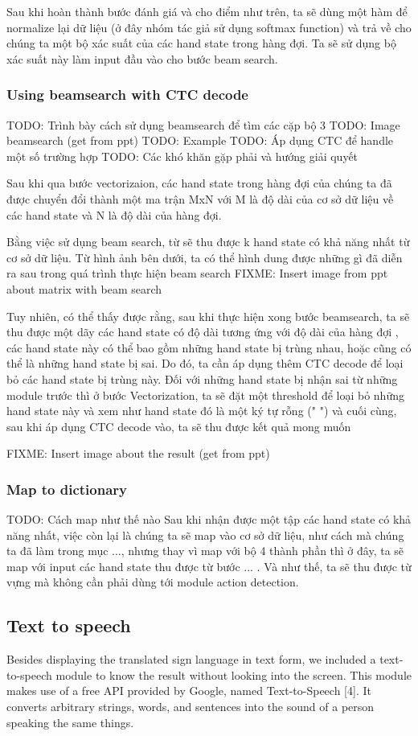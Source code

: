 Sau khi hoàn thành bước đánh giá và cho điểm như trên, ta sẽ dùng một hàm để normalize
lại dữ liệu (ở đây nhóm tác giả sử dụng softmax function) và trả về cho chúng ta một bộ xác suất của các hand state trong hàng đợi. Ta sẽ sử dụng bộ xác suất này
làm input đầu vào cho bước beam search.
\subsubsection{ Using beamsearch with CTC decode }
TODO: Trình bày cách sử dụng beamsearch để tìm các cặp bộ 3
TODO: Image beamsearch (get from ppt)
TODO: Example
TODO: Áp dụng CTC để handle một số trường hợp
TODO: Các khó khăn gặp phải và hướng giải quyết
      
Sau khi qua bước vectorizaion, các hand state trong hàng đợi của chúng ta
đã được chuyển đổi thành một ma trận MxN với M là độ dài của cơ sở dữ liệu về
các hand state và N là độ dài của hàng đợi.
      
Bằng việc sử dụng beam search, từ sẽ thu được k hand state có khả năng nhất
từ cơ sở dữ liệu. Từ hình ảnh bên dưới, ta có thể hình dung được những gì
đã diễn ra sau trong quá trình thực hiện beam search
FIXME: Insert image from ppt about matrix with beam search

Tuy nhiên, có thể thấy được rằng, sau khi thực hiện xong bước beamsearch,
ta sẽ thu được một dãy các hand state có độ dài tương ứng với độ dài của hàng đợi
, các hand state này có thể bao gồm những hand state bị trùng nhau, hoặc cũng có thể
là những hand state bị sai. Do đó, ta cần áp dụng thêm CTC decode để loại bỏ các hand state
bị trùng này. Đối với những hand state bị nhận sai từ những module trước thì ở bước Vectorization,
ta sẽ đặt một threshold để loại bỏ những hand state này và xem như hand state đó là một ký tự rỗng (" ")
và cuối cùng, sau khi áp dụng CTC decode vào, ta sẽ thu được kết quả mong muốn

FIXME: Insert image about the result (get from ppt)

      
      
\subsubsection{ Map to dictionary }
TODO: Cách map như thế nào
Sau khi nhận được một tập các hand state có khả năng nhất, việc còn lại là
chúng ta sẽ map vào cơ sở dữ liệu, như cách mà chúng ta đã làm trong mục ..., 
nhưng thay vì map với bộ 4 thành phần thì ở đây, ta sẽ map với input các hand state thu được
từ bước ... .
Và như thế, ta sẽ thu được từ vựng mà không cần phải dùng tới module action detection.

\subsection{Text to speech}

Besides displaying the translated sign language in text form, we included a text-to-speech module to know the result without looking into the screen. This module makes use of a free API provided by Google, named Text-to-Speech [4]. It converts arbitrary strings, words, and sentences into the sound of a person speaking the same things.